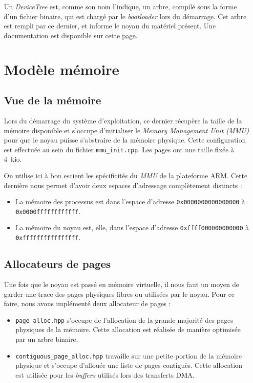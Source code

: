 \documentclass[french, 12pt]{article}
\begin{document}
Un \textit{DeviceTree} est, comme son nom l'indique, un arbre, compilé sous la
forme d'un fichier binaire, qui est chargé par le \textit{bootloader} lors du
démarrage. Cet arbre est rempli par ce dernier, et informe le noyau du matériel
présent. Une documentation est disponible sur cette
\href{https://www.devicetree.org/specifications/}{page}.

\section{Modèle mémoire}
\subsection{Vue de la mémoire}
Lors du démarrage du système d'exploitation, ce dernier récupère la taille de la
mémoire disponible et s'occupe d'initialiser le \textit{Memory Management Unit (MMU)}
pour que le noyau puisse s'abstraire de la mémoire physique. Cette configuration
est effectuée au sein du fichier \texttt{mmu\_init.cpp}. Les pages ont une
taille fixée à 4~kio.

On utilise ici à bon escient les spécificités du \textit{MMU} de la plateforme
ARM. Cette dernière nous permet d'avoir deux espaces d'adressage complètement
distincts :

\begin{itemize}
    \item La mémoire des processus est dans l'espace d'adresse \texttt{0x0000000000000000} à \texttt{0x0000ffffffffffff}.
    \item La mémoire du noyau est, elle, dans l'espace d'adresse \texttt{0xffff000000000000} à \texttt{0xffffffffffffffff}.
\end{itemize}


\subsection{Allocateurs de pages}
Une fois que le noyau est passé en mémoire virtuelle, il nous faut un moyen
de garder une trace des pages physiques libres ou utilisées par le noyau. Pour
ce faire, nous avons implémenté deux allocateur de pages :
\begin{itemize}
    \item \texttt{page\_alloc.hpp} s'occupe de l'allocation de la grande
          majorité des pages physiques de la mémoire. Cette allocation est
          réalisée de manière optimisée par un arbre binaire. %
    \item \texttt{contiguous\_page\_alloc.hpp} travaille sur une petite portion
          de la mémoire physique et s'occupe d'allouée une liste de pages
          contiguës. Cette allocation est utilisée pour les \textit{buffers}
          utilisés lors des transferts DMA.
\end{itemize}
\end{document}
